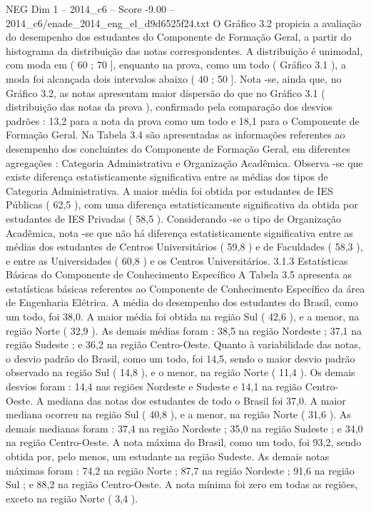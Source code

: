 \begin{textsample}{NEG Dim 1 – 2014\_c6 – Score -9.00 – 2014\_c6/enade\_2014\_eng\_el\_d9d6525f24.txt}
O Gráfico 3.2 propicia a avaliação do desempenho dos estudantes do Componente de Formação Geral, a partir do histograma da distribuição das notas correspondentes.
A distribuição é unimodal, com moda em ( 60 ; 70 ], enquanto na prova, como um todo ( Gráfico 3.1 ), a moda foi alcançada dois intervalos abaixo ( 40 ; 50 ].
Nota -se, ainda que, no Gráfico 3.2, as notas apresentam maior dispersão do que no Gráfico 3.1 ( distribuição das notas da prova ), confirmado pela comparação dos desvios padrões : 13,2 para a nota da prova como um todo e 18,1 para o Componente de Formação Geral.
Na Tabela 3.4 são apresentadas as informações referentes ao desempenho dos concluintes do Componente de Formação Geral, em diferentes agregações : Categoria Administrativa e Organização Acadêmica.
Observa -se que existe diferença estatisticamente significativa entre as médias dos tipos de Categoria Administrativa.
A maior média foi obtida por estudantes de IES Públicas ( 62,5 ), com uma diferença estatisticamente significativa da obtida por estudantes de IES Privadas ( 58,5 ).
Considerando -se o tipo de Organização Acadêmica, nota -se que não há diferença estatisticamente significativa entre as médias dos estudantes de Centros Universitários ( 59,8 ) e de Faculdades ( 58,3 ), e entre as Universidades ( 60,8 ) e os Centros Universitários. 3.1.3 Estatísticas Básicas do Componente de Conhecimento Específico A Tabela 3.5 apresenta as estatísticas básicas referentes ao Componente de Conhecimento Específico da área de Engenharia Elétrica.
A média do desempenho dos estudantes do Brasil, como um todo, foi 38,0.
A maior média foi obtida na região Sul ( 42,6 ), e a menor, na região Norte ( 32,9 ).
As demais médias foram : 38,5 na região Nordeste ; 37,1 na região Sudeste ; e 36,2 na região Centro-Oeste.
Quanto à variabilidade das notas, o desvio padrão do Brasil, como um todo, foi 14,5, sendo o maior desvio padrão observado na região Sul ( 14,8 ), e o menor, na região Norte ( 11,4 ).
Os demais desvios foram : 14,4 nas regiões Nordeste e Sudeste e 14,1 na região Centro-Oeste.
A mediana das notas dos estudantes de todo o Brasil foi 37,0.
A maior mediana ocorreu na região Sul ( 40,8 ), e a menor, na região Norte ( 31,6 ).
As demais medianas foram : 37,4 na região Nordeste ; 35,0 na região Sudeste ; e 34,0 na região Centro-Oeste.
A nota máxima do Brasil, como um todo, foi 93,2, sendo obtida por, pelo menos, um estudante na região Sudeste.
As demais notas máximas foram : 74,2 na região Norte ; 87,7 na região Nordeste ; 91,6 na região Sul ; e 88,2 na região Centro-Oeste.
A nota mínima foi zero em todas as regiões, exceto na região Norte ( 3,4 ).

\end{textsample}
